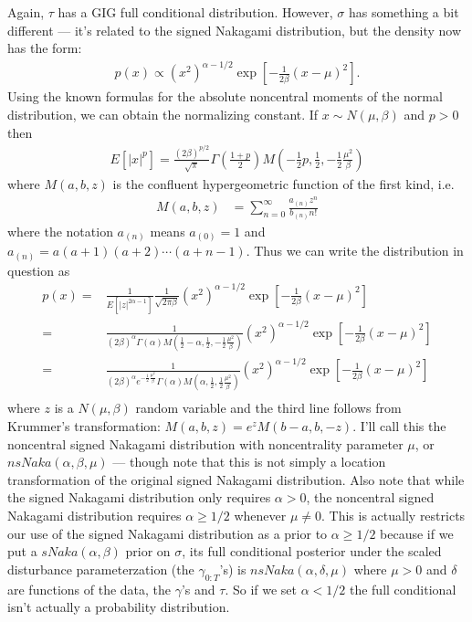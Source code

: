 \documentclass{article}
\begin{document}
Again, $\tau$ has a GIG full conditional distribution. However, $\sigma$ has something a bit different --- it's related to the signed Nakagami distribution, but the density now has the form:
\begin{align*}
  p(x)\propto (x^2)^{\alpha - 1/2}\exp\left[-\frac{1}{2\beta}(x-\mu)^2\right].
\end{align*}
Using the known formulas for the absolute noncentral moments of the normal distribution, we can obtain the normalizing constant. If $x\sim N(\mu,\beta)$ and $p>0$ then 
\begin{align*}
  E[|x|^{p} ] = \frac{(2\beta)^{p/2}}{\sqrt{\pi}}\Gamma\left(\frac{1+p}{2}\right)M\left(-\frac{1}{2}p,\frac{1}{2},-\frac{1}{2}\frac{\mu^2}{\beta}\right)
\end{align*}
where $M(a,b,z)$ is the confluent hypergeometric function of the first kind, i.e.
\begin{align*}
  M(a,b,z) & = \sum_{n=0}^\infty \frac{a_{(n)}z^n}{b_{(n)}n!}
\end{align*}
where the notation $a_{(n)}$ means  $a_{(0)}=1$ and $a_{(n)} = a(a+1)(a+2)\cdots(a+n-1)$. Thus we can write the distribution in question as 
\begin{align*}
  p(x) =& \frac{1}{E[|z|^{2\alpha -1}]}\frac{1}{\sqrt{2\pi \beta}} (x^2)^{\alpha - 1/2}\exp\left[-\frac{1}{2\beta}(x-\mu)^2\right]\\
  =& \frac{1}{(2\beta)^{\alpha}\Gamma\left(\alpha\right)M\left(\frac{1}{2}-\alpha,\frac{1}{2},-\frac{1}{2}\frac{\mu^2}{\beta}\right)}(x^2)^{\alpha - 1/2}\exp\left[-\frac{1}{2\beta}(x-\mu)^2\right]\\
    =& \frac{1}{(2\beta)^{\alpha}e^{-\frac{1}{2}\frac{\mu^2}{\beta}}\Gamma\left(\alpha\right)M\left(\alpha,\frac{1}{2},\frac{1}{2}\frac{\mu^2}{\beta}\right)}(x^2)^{\alpha - 1/2}\exp\left[-\frac{1}{2\beta}(x-\mu)^2\right]\\
\end{align*}
where $z$ is a $N(\mu,\beta)$ random variable and the third line follows from Krummer's transformation: $M(a,b,z)=e^zM(b-a,b,-z)$. I'll call this the noncentral signed Nakagami distribution with noncentrality parameter $\mu$, or $nsNaka(\alpha, \beta, \mu)$ --- though note that this is not simply a location transformation of the original signed Nakagami distribution. Also note that while the signed Nakagami distribution only requires $\alpha>0$, the noncentral signed Nakagami distribution requires $\alpha\geq 1/2$ whenever $\mu\neq 0$. This is actually restricts our use of the signed Nakagami distribution as a prior to $\alpha\geq 1/2$ because if we put a $sNaka(\alpha,\beta)$ prior on $\sigma$, its full conditional posterior under the scaled disturbance parameterzation (the $\gamma_{0:T}$'s) is $nsNaka(\alpha,\delta,\mu)$ where $\mu>0$ and $\delta$ are functions of the data, the $\gamma$'s and $\tau$. So if we set $\alpha <1/2$ the full conditional isn't actually a probability distribution.
\end{document}
